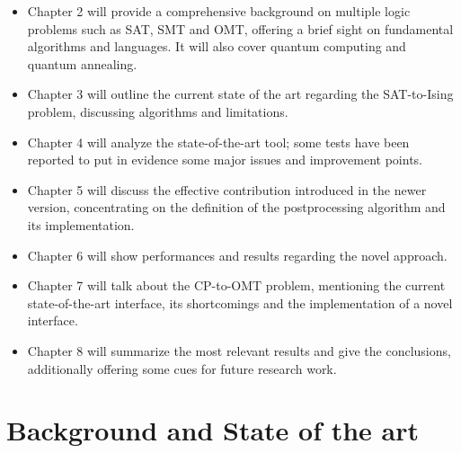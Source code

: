 \begin{itemize}
    \item Chapter 2 will provide a comprehensive background on multiple logic problems such as SAT, SMT and OMT, offering a brief sight on fundamental algorithms and languages. It will also cover quantum computing and quantum annealing.
    \item Chapter 3 will outline the current state of the art regarding the SAT-to-Ising problem, discussing algorithms and limitations.
    \item Chapter 4 will analyze the state-of-the-art tool; some tests have been reported to put in evidence some major issues and improvement points.
    \item Chapter 5 will discuss the effective contribution introduced in the newer version, concentrating on the definition of the postprocessing algorithm and its implementation.
    \item Chapter 6 will show performances and results regarding the novel approach. 
    \item Chapter 7 will talk about the CP-to-OMT problem, mentioning the current state-of-the-art interface, its shortcomings and the implementation of a novel interface.
    \item Chapter 8 will summarize the most relevant results and give the conclusions, additionally offering some cues for future research work.
\end{itemize}

\newpage

\part{Background and State of the art}